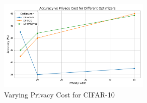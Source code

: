 \begin{figure}[ht]
    \centering
    \includegraphics[width=0.65\textwidth]{accuracy_vs_privacy_cost.png}
    \caption{Varying Privacy Cost for CIFAR-10}
    \label{fig:image_label}
\end{figure}

